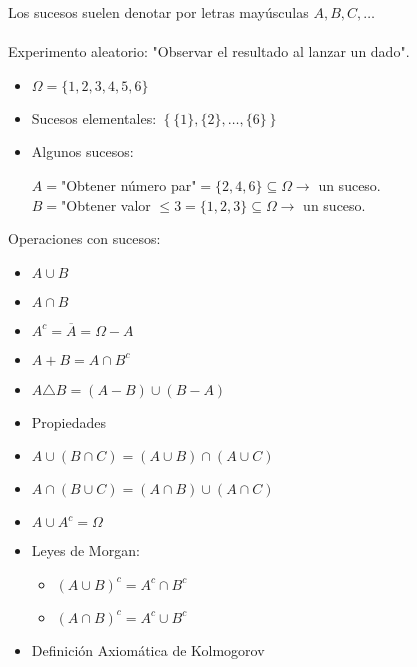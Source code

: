 Los sucesos suelen denotar por letras mayúsculas $A,B,C,\dots$\\
\Ej\\
Experimento aleatorio: "Observar el resultado al lanzar un dado".
\begin{itemize}[label=$-$]
	\item $\Omega=\{1,2,3,4,5,6\}$
	\item Sucesos elementales: $\left\{\{1\},\{2\},\dots,\{6\}\right\}$
	\item Algunos sucesos:
	
	$A=$"Obtener número par"$=\{2,4,6\}\subseteq\Omega\longrightarrow$ un suceso.\\
	$B=$"Obtener valor $\le3=\{1,2,3\}\subseteq\Omega\longrightarrow$ un suceso.
\end{itemize}
Operaciones con sucesos:
\begin{multicols}{3}
	\begin{itemize}[label=$-$]
		\item $A\cup B$
		\item $A\cap B$
		\item $A^c=\overline{A}=\Omega-A$
		\item $A+B=A\cap B^c$
		\item $A\triangle B=(A-B)\cup(B-A)$
\end{itemize}
\end{multicols}
\begin{itemize}[label=\color{red}\textbullet, leftmargin=*]
	\item \color{lightblue}Propiedades
\end{itemize}
\begin{itemize}[label=$-$]
	\item $A\cup(B\cap C)=(A\cup B)\cap(A\cup C)$
	\item $A\cap(B\cup C)=(A\cap B)\cup(A\cap C)$
	\item $A\cup A^c=\Omega$
	\item Leyes de Morgan:
	\begin{itemize}[label=$-$]
		\item $(A\cup B)^c=A^c\cap B^c$
		\item $(A\cap B)^c=A^c\cup B^c$
	\end{itemize}
\end{itemize}
\begin{itemize}[label=\color{red}\textbullet, leftmargin=*]
	\item \color{lightblue}Definición Axiomática de Kolmogorov
\end{itemize}
